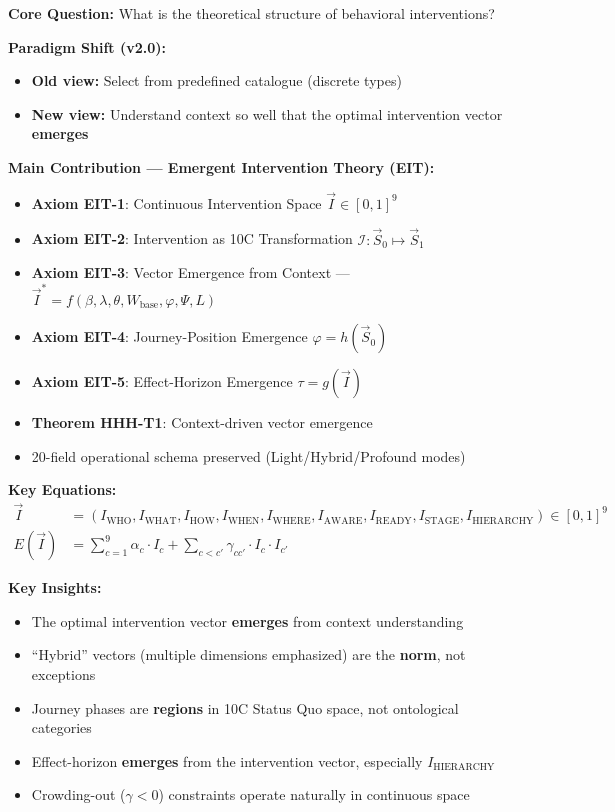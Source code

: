 \begin{tcolorbox}[colback=green!10!white, colframe=green!75!black,
    title=\textbf{Appendix HHH: Summary (v2.0 --- Emergent Intervention Theory)}]

\textbf{Core Question:} What is the theoretical structure of behavioral interventions?

\textbf{Paradigm Shift (v2.0):}
\begin{itemize}[nosep]
    \item \textbf{Old view:} Select from predefined catalogue (discrete types)
    \item \textbf{New view:} Understand context so well that the optimal intervention vector \textbf{emerges}
\end{itemize}

\textbf{Main Contribution --- Emergent Intervention Theory (EIT):}
\begin{itemize}[nosep]
    \item \textbf{Axiom EIT-1}: Continuous Intervention Space $\vec{I} \in [0,1]^9$
    \item \textbf{Axiom EIT-2}: Intervention as 10C Transformation $\mathcal{I}: \vec{S}_0 \mapsto \vec{S}_1$
    \item \textbf{Axiom EIT-3}: Vector Emergence from Context --- $\vec{I}^* = f(\beta, \lambda, \theta, W_{\text{base}}, \varphi, \Psi, L)$
    \item \textbf{Axiom EIT-4}: Journey-Position Emergence $\varphi = h(\vec{S}_0)$
    \item \textbf{Axiom EIT-5}: Effect-Horizon Emergence $\tau = g(\vec{I})$
    \item \textbf{Theorem HHH-T1}: Context-driven vector emergence
    \item 20-field operational schema preserved (Light/Hybrid/Profound modes)
\end{itemize}

\textbf{Key Equations:}
\begin{align*}
\vec{I} &= (I_{\text{WHO}}, I_{\text{WHAT}}, I_{\text{HOW}}, I_{\text{WHEN}}, I_{\text{WHERE}}, I_{\text{AWARE}}, I_{\text{READY}}, I_{\text{STAGE}}, I_{\text{HIERARCHY}}) \in [0,1]^9 \\
E(\vec{I}) &= \sum_{c=1}^{9} \alpha_c \cdot I_c + \sum_{c < c'} \gamma_{cc'} \cdot I_c \cdot I_{c'}
\end{align*}

\textbf{Key Insights:}
\begin{itemize}[nosep]
    \item The optimal intervention vector \textbf{emerges} from context understanding
    \item ``Hybrid'' vectors (multiple dimensions emphasized) are the \textbf{norm}, not exceptions
    \item Journey phases are \textbf{regions} in 10C Status Quo space, not ontological categories
    \item Effect-horizon \textbf{emerges} from the intervention vector, especially $I_{\text{HIERARCHY}}$
    \item Crowding-out ($\gamma < 0$) constraints operate naturally in continuous space
\end{itemize}


\end{tcolorbox}
